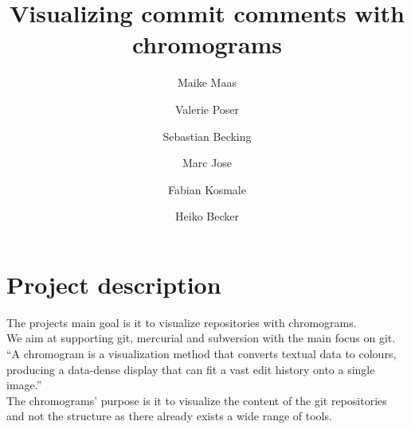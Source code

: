 \documentclass[12pt]{scrartcl}
\author{Maike Maas \and Valerie Poser \and Sebastian Becking
\and Marc Jose \and Fabian Kosmale  \and Heiko Becker}
\title{Visualizing commit comments with chromograms}
\begin{document}
\maketitle
\section{Project description}
The projects main goal is it to visualize repositories with chromograms.\\
We aim at supporting git, mercurial and subversion with the main focus on git.\\
\enquote{A chromogram is a visualization method that converts textual data to colours, producing a data-dense display that can fit a vast edit history onto a single image.}\cite{}\\
The chromograms' purpose is it to visualize the content of the git repositories and not the structure as 
there already exists a wide range of tools.\\
\end{document}
